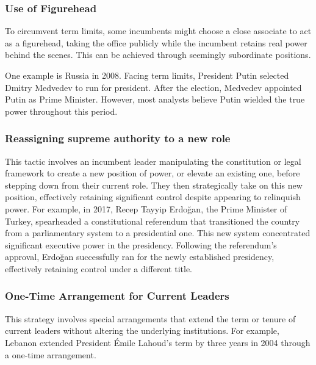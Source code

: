 \documentclass[
  12pt,
]{report}
\begin{document}
\subsubsection*{\texorpdfstring{\textbf{Use of
Figurehead}}{Use of Figurehead}}\label{use-of-figurehead}

To circumvent term limits, some incumbents might choose a close
associate to act as a figurehead, taking the office publicly while the
incumbent retains real power behind the scenes. This can be achieved
through seemingly subordinate positions.

One example is Russia in 2008. Facing term limits, President Putin
selected Dmitry Medvedev to run for president. After the election,
Medvedev appointed Putin as Prime Minister. However, most analysts
believe Putin wielded the true power throughout this period.

\subsubsection*{Reassigning supreme authority to a new
role}\label{reassigning-supreme-authority-to-a-new-role}

This tactic involves an incumbent leader manipulating the constitution
or legal framework to create a new position of power, or elevate an
existing one, before stepping down from their current role. They then
strategically take on this new position, effectively retaining
significant control despite appearing to relinquish power. For example,
in 2017, Recep Tayyip Erdoğan, the Prime Minister of Turkey, spearheaded
a constitutional referendum that transitioned the country from a
parliamentary system to a presidential one. This new system concentrated
significant executive power in the presidency. Following the
referendum's approval, Erdoğan successfully ran for the newly
established presidency, effectively retaining control under a different
title.

\subsubsection*{One-Time Arrangement for Current
Leaders}\label{one-time-arrangement-for-current-leaders}

This strategy involves special arrangements that extend the term or
tenure of current leaders without altering the underlying institutions.
For example, Lebanon extended President Émile Lahoud's term by three
years in 2004 through a one-time arrangement.
\end{document}
